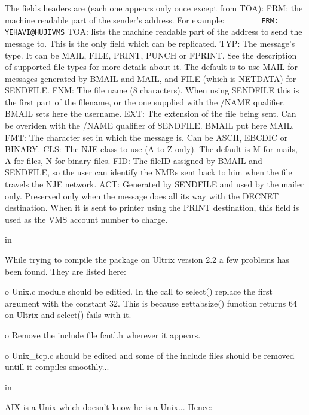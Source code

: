 The fields headers are (each one appears only once except from TOA):
\hfill\break
{\ncrBold FRM:} the machine readable part of the sender's address. For example:
\hfill\break
{\tt ~~~~~~~~FRM: YEHAVI@HUJIVMS}
\hfill\break
{\ncrBold TOA:} lists the machine readable part of the address to send the 
message
to. This is the only field which can be replicated.
\hfill\break
{\ncrBold TYP:}  The  message's type. It can be MAIL, FILE, PRINT, PUNCH or
FPRINT.
See the description of supported file types for more details  about  it.
The default is to use MAIL for messages generated by BMAIL and MAIL, and
FILE (which is NETDATA) for SENDFILE.
\hfill\break
{\ncrBold FNM:} The file name (8 characters). When using SENDFILE this is the
first
part  of  the  filename,  or  the one supplied with the /NAME qualifier.
BMAIL sets here the username.
\hfill\break
{\ncrBold EXT}: The extension of the file being sent.  Can  be  overiden  with 
the
/NAME qualifier of SENDFILE. BMAIL put here MAIL.
\hfill\break
{\ncrBold FMT:}  The character set in which the message is. Can be ASCII,
EBCDIC or
BINARY.
\hfill\break
{\ncrBold CLS:} The NJE class to use (A to Z only). The default is M for 
mails,  A
for files, N for binary files.
\hfill\break
{\ncrBold FID:} The fileID assigned by BMAIL and SENDFILE, so the user can
identify
the NMRs sent back to him when the file travels the NJE network.
\hfill\break
{\ncrBold ACT:} Generated by SENDFILE and used by the mailer only.  Preserved 
only
when  the  message does all its way with the DECNET destination. When it
is sent to printer using the PRINT destination, this field  is  used  as
the VMS account number to charge.

 in

While trying to compile the package  on  Ultrix  version  2.2  a  few
problems has been found. They are listed here:

{\ncrBold o}
Unix.c  module should be editied. In the call to select() replace the
first argument with the constant 32.  This  is  because  gettabsize()
function returns 64 on Ultrix and select() fails with it.

{\ncrBold o}
Remove the include file fcntl.h wherever it appears.

{\ncrBold o}
Unix\_tcp.c  should  be edited and some of the include files should be
removed untill it compiles smoothly...

 in

AIX is a Unix which doesn't know he is a Unix... Hence:

